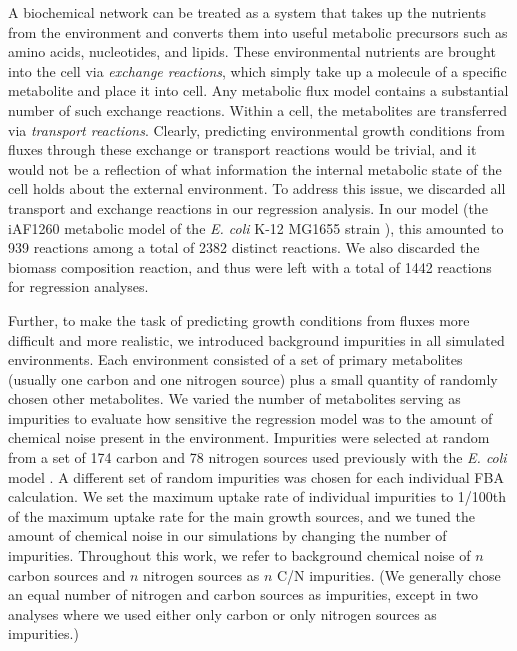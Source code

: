 \documentclass[12pt]{article}
\begin{document}
A biochemical network can be treated as a system that takes up the nutrients from the environment and converts them into useful metabolic precursors such as amino acids, nucleotides, and lipids. These environmental nutrients are brought into the cell via \emph{exchange reactions}, which simply take up a molecule of a specific metabolite and place it into cell. Any metabolic flux model contains a substantial number of such exchange reactions. Within a cell, the metabolites are transferred via \emph{transport reactions}. Clearly, predicting environmental growth conditions from fluxes through these exchange or transport reactions would be trivial, and it would not be a reflection of what information the internal metabolic state of the cell holds about the external environment. To address this issue, we discarded all transport and exchange reactions in our regression analysis. In our model (the iAF1260 metabolic model of the \emph{E. coli} K-12 MG1655 strain \cite{Schellenbergeretal2010}), this amounted to 939 reactions among a total of 2382 distinct reactions. We also discarded the biomass composition reaction, and thus were left with a total of 1442 reactions for regression analyses.

Further, to make the task of predicting growth conditions from fluxes more difficult and more realistic, we introduced background impurities in all simulated environments. Each environment consisted of a set of primary metabolites (usually one carbon and one nitrogen source) plus a small quantity of randomly chosen other metabolites. We varied the number of metabolites serving as impurities to evaluate how sensitive the regression model was to the amount of chemical noise present in the environment. Impurities were selected at random from a set of 174 carbon and 78 nitrogen sources used previously with the \emph{E. coli} model \cite{Feistetal2007}. A different set of random impurities was chosen for each individual FBA calculation. We set the maximum uptake rate of individual impurities to 1/100th of the maximum uptake rate for the main growth sources, and we tuned the amount of chemical noise in our simulations by changing the number of impurities. Throughout this work, we refer to background chemical noise of $n$ carbon sources and $n$ nitrogen sources as $n$ C/N impurities. (We generally chose an equal number of nitrogen and carbon sources as impurities, except in two analyses where we used either only carbon or only nitrogen sources as impurities.)
\end{document}
